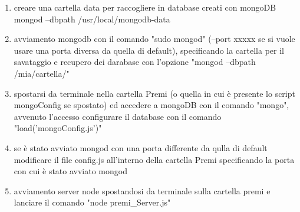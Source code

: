 \documentclass[a4paper,12pt]{article}
\begin{document}
\begin{enumerate}
\item creare una cartella data per raccogliere in database creati con mongoDB
mongod --dbpath /usr/local/mongodb-data
\item avviamento mongodb con il comando "sudo mongod" (--port xxxxx se si vuole usare una porta diversa da quella di default), specificando la cartella per il savataggio e recupero dei darabase con l'opzione "mongod --dbpath /mia/cartella/"
\item  spostarsi da terminale nella cartella Premi (o quella in cui \`{e} presente lo script mongoConfig se spostato) ed accedere a mongoDB con il comando "mongo", avvenuto l'accesso configurare il database con il comando "load('mongoConfig.js')"
\item se \`{e} stato avviato mongod con una porta differente da qulla di default modificare il file config.js all'interno della cartella Premi specificando la porta con cui \`{e} stato avviato mongod
\item  avviamento server node spostandosi da terminale sulla cartella premi e lanciare il comando "node premi\_Server.js" %

\end{enumerate}

	
\end{document}
